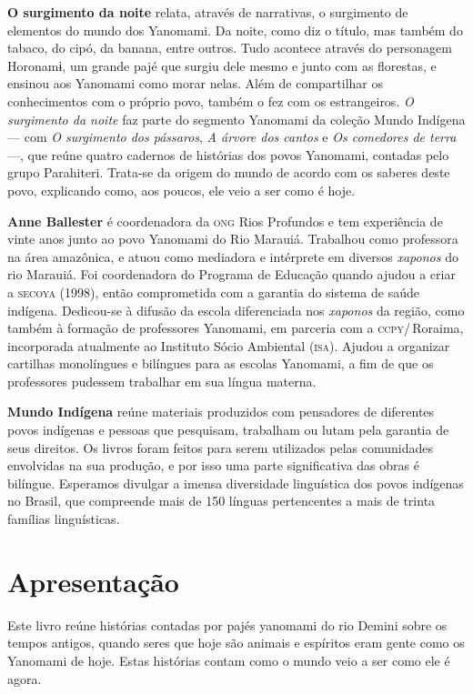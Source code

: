 \textbf{O surgimento da noite} relata, através de narrativas, o surgimento de elementos do mundo dos Yanomami. Da noite, como diz o título, mas também do tabaco, do cipó, da banana, entre outros. Tudo acontece através do personagem Horonamɨ, um grande pajé que surgiu dele mesmo e junto com as florestas, e ensinou aos Yanomami como morar nelas. Além de compartilhar os conhecimentos com o próprio povo, também o fez com os estrangeiros. \textit{O surgimento da noite} faz parte do segmento Yanomami da coleção Mundo Indígena --- com \textit{O surgimento dos pássaros}, \textit{A árvore dos cantos} e \textit{Os comedores de terra} ---, que reúne quatro cadernos de histórias dos povos Yanomami, contadas pelo grupo Parahiteri. Trata-se da origem do mundo de acordo com os saberes deste povo, explicando como, aos poucos, ele veio a ser como é hoje. 

\textbf{Anne Ballester} é coordenadora da \textsc{ong} Rios Profundos e tem experiência de vinte anos junto ao povo Yanomami do Rio Marauiá. Trabalhou como professora na área amazônica, e atuou como mediadora e intérprete em diversos \textit{xaponos} do rio Marauiá. Foi coordenadora do Programa de Educação quando ajudou a criar a \textsc{secoya} (1998), então comprometida com a garantia do sistema de saúde indígena. Dedicou-se à difusão da escola diferenciada nos \textit{xaponos} da região, como também à formação de professores Yanomami, em parceria com a \textsc{ccpy}/\,Roraima, incorporada atualmente ao Instituto Sócio Ambiental (\textsc{isa}). Ajudou a organizar cartilhas monolíngues e bilíngues para as escolas Yanomami, a fim de que os professores pudessem trabalhar em sua língua materna.

\textbf{Mundo Indígena} reúne materiais produzidos com pensadores de diferentes povos indígenas e pessoas que pesquisam, trabalham ou lutam pela garantia de seus direitos. Os livros foram feitos para serem utilizados pelas comunidades envolvidas na sua produção, e por isso uma parte significativa das obras é bilíngue. Esperamos divulgar a imensa diversidade linguística dos povos indígenas no Brasil, que compreende mais de 150 línguas pertencentes a mais de trinta famílias linguísticas.


\chapter{Apresentação}

Este livro reúne histórias contadas por pajés yanomami do rio Demini sobre os tempos antigos, quando seres que hoje são animais e espíritos eram gente como os Yanomami de hoje. Estas histórias contam como o mundo veio a ser como ele é agora.

